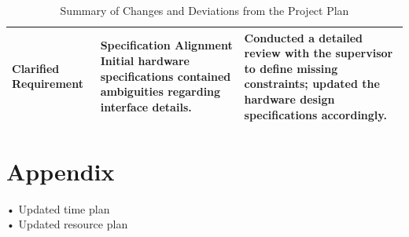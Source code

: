 \documentclass[10pt]{article}
\begin{document}
\begin{table}[h!]
\begin{tabular}{|p{}|p{}|p{}|}
        \textbf{Clarified Requirement} & 
        \textbf{Specification Alignment} \newline 
        Initial hardware specifications contained ambiguities regarding interface details. & 
        Conducted a detailed review with the supervisor to define missing constraints; updated the hardware design specifications accordingly. \\
        \hline
        
    \end{tabular}
    \caption{Summary of Changes and Deviations from the Project Plan}
    \label{tab:project_changes}
\end{table}


\section{Appendix}
• Updated time plan\\
• Updated resource plan
\end{document}
